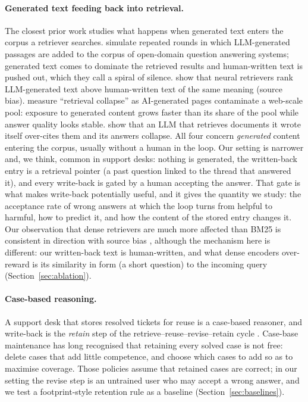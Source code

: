 \documentclass[11pt]{article}
\begin{document}
\paragraph{Generated text feeding back into retrieval.} The closest prior work studies what happens when generated text enters the corpus a retriever searches. \citet{chen2024spiral} simulate repeated rounds in which LLM-generated passages are added to the corpus of open-domain question answering systems; generated text comes to dominate the retrieved results and human-written text is pushed out, which they call a spiral of silence. \citet{dai2024sourcebias} show that neural retrievers rank LLM-generated text above human-written text of the same meaning (source bias). \citet{yu2026collapse} measure ``retrieval collapse'' as AI-generated pages contaminate a web-scale pool: exposure to generated content grows faster than its share of the pool while answer quality looks stable. \citet{druck2026ragcollapse} show that an LLM that retrieves documents it wrote itself over-cites them and its answers collapse. All four concern \emph{generated} content entering the corpus, usually without a human in the loop. Our setting is narrower and, we think, common in support desks: nothing is generated, the written-back entry is a retrieval pointer (a past question linked to the thread that answered it), and every write-back is gated by a human accepting the answer. That gate is what makes write-back potentially useful, and it gives the quantity we study: the acceptance rate of wrong answers at which the loop turns from helpful to harmful, how to predict it, and how the content of the stored entry changes it. Our observation that dense retrievers are much more affected than BM25 is consistent in direction with source bias \citep{dai2024sourcebias}, although the mechanism here is different: our written-back text is human-written, and what dense encoders over-reward is its similarity in form (a short question) to the incoming query (Section~\ref{sec:ablation}).

\paragraph{Case-based reasoning.} A support desk that stores resolved tickets for reuse is a case-based reasoner, and write-back is the \emph{retain} step of the retrieve--reuse--revise--retain cycle \citep{aamodt1994cbr}. Case-base maintenance has long recognised that retaining every solved case is not free: \citet{smyth1995forget} delete cases that add little competence, and \citet{zhu1999add} choose which cases to add so as to maximise coverage. Those policies assume that retained cases are correct; in our setting the revise step is an untrained user who may accept a wrong answer, and we test a footprint-style retention rule as a baseline (Section~\ref{sec:baselines}).
\end{document}
